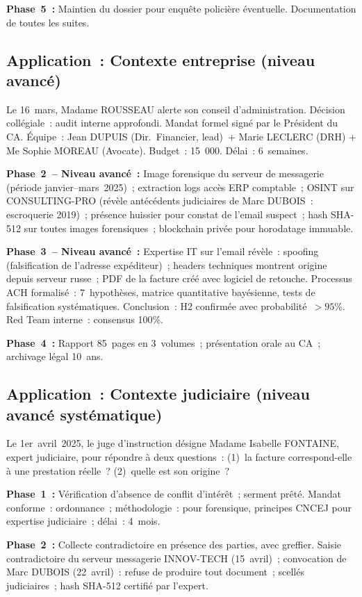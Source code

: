 \textbf{Phase~5~:} Maintien du dossier pour enquête policière éventuelle.
Documentation de toutes les suites.

\subsection{Application~: Contexte entreprise (niveau avancé)}

Le 16~mars, Madame ROUSSEAU alerte son conseil d'administration. Décision
collégiale~: audit interne approfondi. Mandat formel signé par le Président
du CA. Équipe~: Jean DUPUIS (Dir.~Financier, lead)~+ Marie LECLERC (DRH)
+ Me Sophie MOREAU (Avocate). Budget~: 15~000. Délai~: 6~semaines.

\textbf{Phase~2~-- Niveau avancé~:} Image forensique du serveur de messagerie
(période janvier--mars~2025)~; extraction logs accès ERP comptable~;
OSINT sur CONSULTING-PRO (révèle antécédents judiciaires de Marc DUBOIS~:
escroquerie 2019)~; présence huissier pour constat de l'email suspect~;
hash SHA-512 sur toutes images forensiques~; blockchain privée pour
horodatage immuable.

\textbf{Phase~3~-- Niveau avancé~:} Expertise IT sur l'email révèle~: spoofing
(falsification de l'adresse expéditeur)~; headers techniques montrent origine
depuis serveur russe~; PDF de la facture créé avec logiciel de retouche.
Processus ACH formalisé~: 7~hypothèses, matrice quantitative bayésienne,
tests de falsification systématiques. Conclusion~: H2 confirmée avec
probabilité~$> 95\%$. Red Team interne~: consensus 100\%.

\textbf{Phase~4~:} Rapport 85~pages en 3~volumes~; présentation orale au
CA~; archivage légal 10~ans.

\subsection{Application~: Contexte judiciaire (niveau avancé systématique)}

Le 1er~avril~2025, le juge d'instruction désigne Madame Isabelle FONTAINE,
expert judiciaire, pour répondre à deux questions~: (1)~la facture correspond-elle
à une prestation réelle~? (2)~quelle est son origine~?

\textbf{Phase~1~:} Vérification d'absence de conflit d'intérêt~; serment prêté.
Mandat conforme~: ordonnance~; méthodologie~:  pour forensique,
principes CNCEJ pour expertise judiciaire~; délai~: 4~mois.

\textbf{Phase~2~:} Collecte contradictoire en présence des parties, avec
greffier. Saisie contradictoire du serveur messagerie INNOV-TECH (15~avril)~;
convocation de Marc DUBOIS (22~avril)~: refuse de produire tout document~;
scellés judiciaires~; hash SHA-512 certifié par l'expert.

